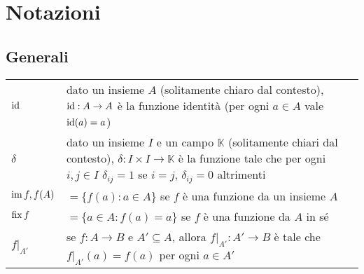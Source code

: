 \renewcommand{\arraystretch}{1.5}

\chapter{Notazioni}
\section{Generali}
\begin{tabularx}{\textwidth}{SX}
\hline
$\operatorname{id}$ & dato un insieme $A$ (solitamente chiaro dal contesto), $\operatorname{id}:A\to A$ è la funzione identità (per ogni $a\in A$ vale $\operatorname{id}(a)=a$)\\
$\delta$ & dato un insieme $I$ e un campo $\mathbb{K}$ (solitamente chiari dal contesto), $\delta:I\times I\to\mathbb{K}$ è la funzione tale che per ogni $i,j\in I$ $\delta_{ij}=1$ se $i=j$, $\delta_{ij}=0$ altrimenti \\
$\operatorname{im} f,f(A)$ & $=\{f(a):a\in A\}$ se $f$ è una funzione da un insieme $A$\\
$\operatorname{fix} f$ & $=\{a\in A:f(a)=a\}$ se $f$ è una funzione da $A$ in sé\\
$f|_{A'}$ & se $f:A\to B$ e $A'\subseteq A$, allora $f|_{A'}:A'\to B$ è tale che $f|_{A'}(a)=f(a)$ per ogni $a\in A'$\\
\hline
\end{tabularx}
